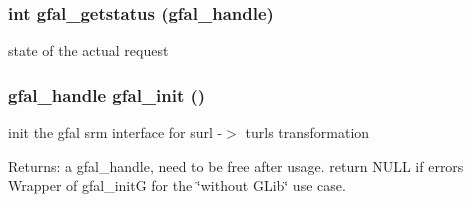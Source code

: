 \subsubsection{\setlength{\rightskip}{0pt plus 5cm}int gfal\_\-getstatus (gfal\_\-handle)}\label{group__srm__group_g1f99a22cf6a648d42530bc83d0ac8861}


state of the actual request 
\subsubsection{\setlength{\rightskip}{0pt plus 5cm}gfal\_\-handle gfal\_\-init ()}\label{group__srm__group_g4e6d4aab98935aaf408d8a5cdf9727d4}


init the gfal srm interface for surl -$>$ turls transformation 

\begin{Desc}
\item[Returns:]a gfal\_\-handle, need to be free after usage. return NULL if errors Wrapper of gfal\_\-init\-G for the \char`\"{}without GLib\char`\"{} use case. \end{Desc}
